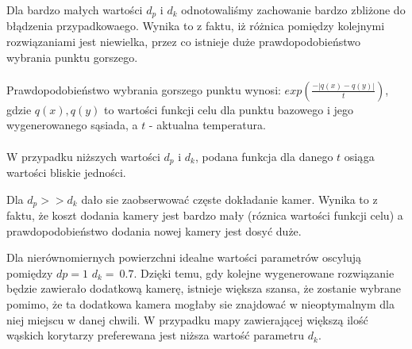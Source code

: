 \documentclass[12pt,a4paper]{article}
\begin{document}
Dla bardzo małych wartości $d_p$ i $d_k$ odnotowaliśmy zachowanie
bardzo zbliżone do błądzenia przypadkowaego.
Wynika to z faktu, iż różnica pomiędzy kolejnymi rozwiązaniami jest niewielka,
przez co istnieje duże prawdopodobieństwo wybrania punktu gorszego.\\ \\
Prawdopodobieństwo wybrania gorszego punktu wynosi:
$exp(\frac{-|q(x)-q(y)|}{t})$,\\
gdzie $q(x), q(y)$ to wartości funkcji celu dla punktu
bazowego i jego wygenerowanego sąsiada, a $t$ - aktualna temperatura. \\ \\
W przypadku niższych wartości $d_p$ i $d_k$, podana funkcja dla danego $t$
osiąga wartości bliskie jedności. \\

\begin{figure}[H]
\begin{floatrow}
       }
       \ffigbox[\FBwidth]{\caption{SlimMap,
       \newline $d_p=1$, $d_k=0.1$, $skala=5$}\label{fig-10}}{%
         \texttt{[image: \{slimMap\_1\_0.1\_5]}.png}
       }
       \end{floatrow}
\end{figure}

Dla $d_p >> d_k$ dało sie zaobserwować częste dokładanie kamer.
Wynika to z faktu, że koszt dodania kamery jest bardzo mały
(róznica wartości funkcji celu) a prawdopodobieństwo
dodania nowej kamery jest dosyć duże. \\

\begin{figure}[H]
\begin{floatrow}
       }
       \ffigbox[\FBwidth]{\caption{SlimMap, \newline
       $d_p=1$, $d_k=0.4$, $skala=5$}\label{fig-12}}{%
         \texttt{[image: \{slimMap\_1\_0.4\_5]}.png}
       }
       \end{floatrow}
\end{figure}
\newpage
Dla nierównomiernych powierzchni idealne wartości parametrów oscylują pomiędzy
$dp=1$ $d_k=~0.7$.
Dzięki temu, gdy kolejne wygenerowane rozwiązanie będzie zawierało
dodatkową kamerę, istnieje większa szansa, że zostanie wybrane pomimo,
że ta dodatkowa kamera mogłaby sie znajdować w nieoptymalnym
dla niej miejscu w danej chwili.
W przypadku mapy zawierającej większą ilość wąskich korytarzy preferewana
jest niższa wartość parametru $d_k$.
%
\end{document}
